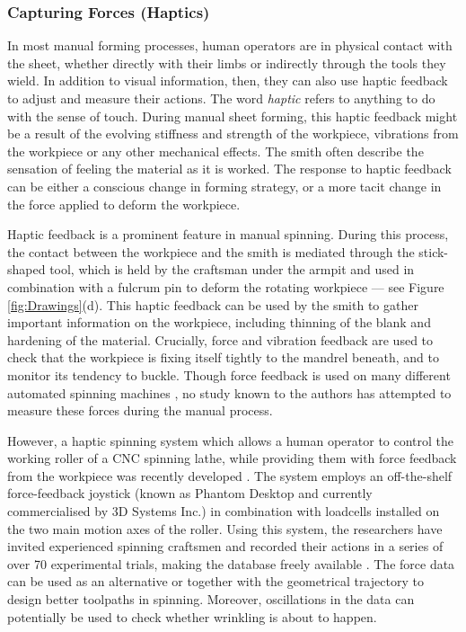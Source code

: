 \subsubsection{Capturing Forces (Haptics)}
In most manual forming processes, human operators are in physical contact with the sheet, whether directly with their limbs or indirectly through the tools they wield. In addition to visual information, then, they can also use haptic feedback to adjust and measure their actions. The word \textit{haptic} refers to anything to do with the sense of touch. During manual sheet forming, this haptic feedback might be a result of the evolving stiffness and strength of the workpiece, vibrations from the workpiece or any other mechanical effects. The smith often describe the sensation of feeling the material as it is worked. The response to haptic feedback can be either a conscious change in forming strategy, or a more tacit change in the force applied to deform the workpiece. 

Haptic feedback is a prominent feature in manual spinning. During this process, the contact between the workpiece and the smith is mediated through the stick-shaped tool, which is held by the craftsman under the armpit and used in combination with a fulcrum pin to deform the rotating workpiece --- see Figure \ref{fig:Drawings}(d). This haptic feedback can be used by the smith to gather important information on the workpiece, including thinning of the blank and hardening of the material. Crucially, force and vibration feedback are used to check that the workpiece is fixing itself tightly to the mandrel beneath, and to monitor its tendency to buckle. Though force feedback is used on many different automated spinning machines \citep{Arai2006Force-controlledMotors}, no study known to the authors has attempted to measure these forces during the manual process. 

However, a haptic spinning system which allows a human operator to control the working roller of a CNC spinning lathe, while providing them with force feedback from the workpiece was recently developed \citep{Russo2019HapticSpinning}. The system employs an off-the-shelf force-feedback joystick (known as Phantom Desktop and currently commercialised by 3D Systems Inc.) in combination with loadcells installed on the two main motion axes of the roller. Using this system, the researchers have invited experienced spinning craftsmen and recorded their actions in a series of over 70 experimental trials, making the database freely available \citep{Russo2020ResearchSpinning}. The force data can be used as an alternative or together with the geometrical trajectory to design better toolpaths in spinning. Moreover, oscillations in the data can potentially be used to check whether wrinkling is about to happen. 

